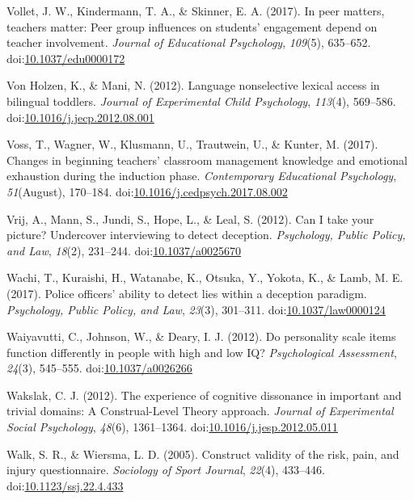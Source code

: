 \documentclass[english,man]{apa6}
\theoremstyle{definition}
\theoremstyle{definition}
\theoremstyle{definition}
\theoremstyle{remark}
\begin{document}
\hypertarget{ref-Vollet2017}{}
Vollet, J. W., Kindermann, T. A., \& Skinner, E. A. (2017). In peer
matters, teachers matter: Peer group influences on students' engagement
depend on teacher involvement. \emph{Journal of Educational Psychology},
\emph{109}(5), 635--652.
doi:\href{https://doi.org/10.1037/edu0000172}{10.1037/edu0000172}

\hypertarget{ref-VonHolzen2012}{}
Von Holzen, K., \& Mani, N. (2012). Language nonselective lexical access
in bilingual toddlers. \emph{Journal of Experimental Child Psychology},
\emph{113}(4), 569--586.
doi:\href{https://doi.org/10.1016/j.jecp.2012.08.001}{10.1016/j.jecp.2012.08.001}

\hypertarget{ref-Voss2017}{}
Voss, T., Wagner, W., Klusmann, U., Trautwein, U., \& Kunter, M. (2017).
Changes in beginning teachers' classroom management knowledge and
emotional exhaustion during the induction phase. \emph{Contemporary
Educational Psychology}, \emph{51}(August), 170--184.
doi:\href{https://doi.org/10.1016/j.cedpsych.2017.08.002}{10.1016/j.cedpsych.2017.08.002}

\hypertarget{ref-Vrij2012}{}
Vrij, A., Mann, S., Jundi, S., Hope, L., \& Leal, S. (2012). Can I take
your picture? Undercover interviewing to detect deception.
\emph{Psychology, Public Policy, and Law}, \emph{18}(2), 231--244.
doi:\href{https://doi.org/10.1037/a0025670}{10.1037/a0025670}

\hypertarget{ref-Wachi2017}{}
Wachi, T., Kuraishi, H., Watanabe, K., Otsuka, Y., Yokota, K., \& Lamb,
M. E. (2017). Police officers' ability to detect lies within a deception
paradigm. \emph{Psychology, Public Policy, and Law}, \emph{23}(3),
301--311.
doi:\href{https://doi.org/10.1037/law0000124}{10.1037/law0000124}

\hypertarget{ref-Waiyavutti2012}{}
Waiyavutti, C., Johnson, W., \& Deary, I. J. (2012). Do personality
scale items function differently in people with high and low IQ?
\emph{Psychological Assessment}, \emph{24}(3), 545--555.
doi:\href{https://doi.org/10.1037/a0026266}{10.1037/a0026266}

\hypertarget{ref-Wakslak2012}{}
Wakslak, C. J. (2012). The experience of cognitive dissonance in
important and trivial domains: A Construal-Level Theory approach.
\emph{Journal of Experimental Social Psychology}, \emph{48}(6),
1361--1364.
doi:\href{https://doi.org/10.1016/j.jesp.2012.05.011}{10.1016/j.jesp.2012.05.011}

\hypertarget{ref-Walk2005}{}
Walk, S. R., \& Wiersma, L. D. (2005). Construct validity of the risk,
pain, and injury questionnaire. \emph{Sociology of Sport Journal},
\emph{22}(4), 433--446.
doi:\href{https://doi.org/10.1123/ssj.22.4.433}{10.1123/ssj.22.4.433}
\end{document}
